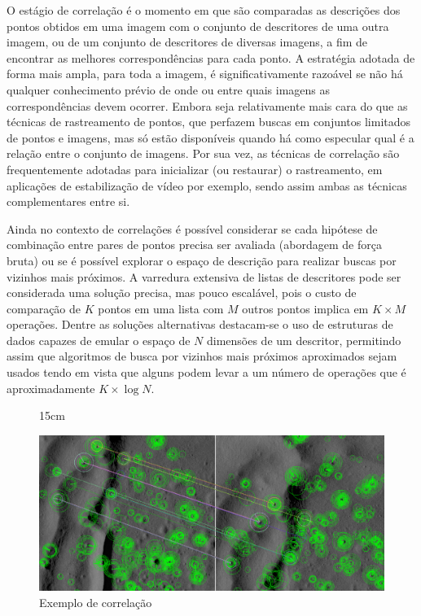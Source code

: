 O estágio de correlação é o momento em que são comparadas as descrições dos pontos obtidos em uma imagem com o conjunto de descritores de uma outra imagem, ou de um conjunto de descritores de diversas imagens, a fim de encontrar as melhores correspondências para cada ponto. A estratégia adotada de forma mais ampla, para toda a imagem, é significativamente razoável se não há qualquer conhecimento prévio de onde ou entre quais imagens as correspondências devem ocorrer. Embora seja relativamente mais cara do que as técnicas de rastreamento de pontos, que perfazem buscas em conjuntos limitados de pontos e imagens, mas só estão disponíveis quando há como especular qual é a relação entre o conjunto de imagens. Por sua vez, as técnicas de correlação são frequentemente adotadas para inicializar (ou restaurar) o rastreamento, em aplicações de estabilização de vídeo por exemplo, sendo assim ambas as técnicas complementares entre si.

Ainda no contexto de correlações é possível considerar se cada hipótese de combinação entre pares de pontos precisa ser avaliada (abordagem de força bruta) ou se é possível explorar o espaço de descrição para realizar buscas por vizinhos mais próximos. A varredura extensiva de listas de descritores pode ser considerada uma solução precisa, mas pouco escalável, pois o custo de comparação de $K$ pontos em uma lista com $M$ outros pontos implica em $K \times M$ operações. Dentre as soluções alternativas destacam-se o uso de estruturas de dados capazes de emular o espaço de $N$
dimensões de um descritor, permitindo assim que algoritmos de busca por vizinhos mais próximos aproximados sejam usados tendo em vista que alguns podem levar a um número de operações que é aproximadamente $K \times \log{N}$.

\begin{figure}[!h]{15cm}
  \caption{Exemplo de correlação} \label{match}
  \includegraphics[width=\hsize]{figuras/match.png}
\end{figure}

